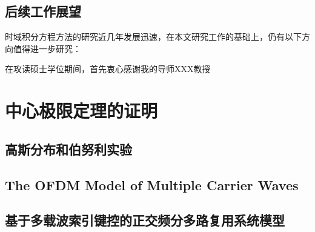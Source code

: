\documentclass[promaster]{thesis-uestc}
\begin{document}
\section{后续工作展望}
时域积分方程方法的研究近几年发展迅速，在本文研究工作的基础上，仍有以下方向值得进一步研究：

\thesisacknowledgement
在攻读硕士学位期间，首先衷心感谢我的导师XXX教授


\nocite{*}

%
% 
%
% 
% 
%

\thesisappendix

\chapter{中心极限定理的证明}

\section{高斯分布和伯努利实验}



\thesistranslationoriginal
\section{The OFDM Model of Multiple Carrier Waves}


\thesistranslationchinese

\section{基于多载波索引键控的正交频分多路复用系统模型}
\end{document}
